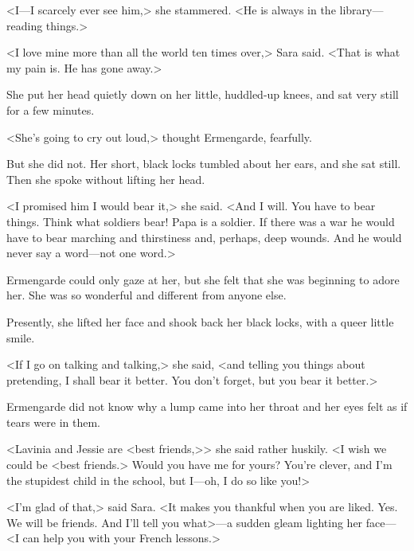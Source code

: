 <I—I scarcely ever see him,> she stammered. <He is always in the library—reading things.>

<I love mine more than all the world ten times over,> Sara said. <That is what my pain is. He has gone away.>

She put her head quietly down on her little, huddled-up knees, and sat very still for a few minutes.

<She's going to cry out loud,> thought Ermengarde, fearfully.

But she did not. Her short, black locks tumbled about her ears, and she sat still. Then she spoke without lifting her head.

<I promised him I would bear it,> she said. <And I will. You have to bear things. Think what soldiers bear! Papa is a soldier. If there was a war he would have to bear marching and thirstiness and, perhaps, deep wounds. And he would never say a word—not one word.>

Ermengarde could only gaze at her, but she felt that she was beginning to adore her. She was so wonderful and different from anyone else.

Presently, she lifted her face and shook back her black locks, with a queer little smile.

<If I go on talking and talking,> she said, <and telling you things about pretending, I shall bear it better. You don't forget, but you bear it better.>

Ermengarde did not know why a lump came into her throat and her eyes felt as if tears were in them.

<Lavinia and Jessie are <best friends,>> she said rather huskily. <I wish we could be <best friends.> Would you have me for yours? You're clever, and I'm the stupidest child in the school, but I—oh, I do so like you!>

<I'm glad of that,> said Sara. <It makes you thankful when you are liked. Yes. We will be friends. And I'll tell you what>—a sudden gleam lighting her face—<I can help you with your French lessons.>

